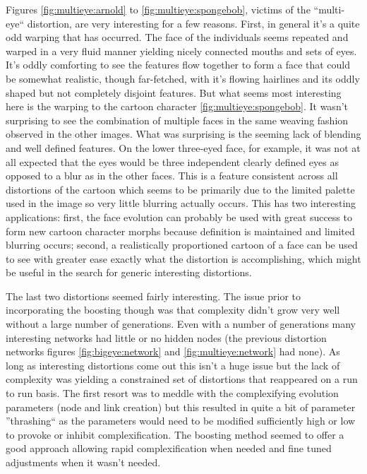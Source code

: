 Figures \ref{fig:multieye:arnold} to \ref{fig:multieye:spongebob}, victims of the ``multi-eye`` distortion, are very interesting for a few reasons. First, in general it's a quite odd warping that has occurred. The face of the individuals seems repeated and warped in a very fluid manner yielding nicely connected mouths and sets of eyes. It's oddly comforting to see the features flow together to form a face that could be somewhat realistic, though far-fetched, with it's flowing hairlines and its oddly shaped but not completely disjoint features. But what seems most interesting here is the warping to the cartoon character \ref{fig:multieye:spongebob}. It wasn't surprising to see the combination of multiple faces in the same weaving fashion observed in the other images. What was surprising is the seeming lack of blending and well defined features. On the lower three-eyed face, for example, it was not at all expected that the eyes would be three independent clearly defined eyes as opposed to a blur as in the other faces. This is a feature consistent across all distortions of the cartoon which seems to be primarily due to the limited palette used in the image so very little blurring actually occurs. This has two interesting applications: first, the face evolution can probably be used with great success to form new cartoon character morphs because definition is maintained and limited blurring occurs; second, a realistically proportioned cartoon of a face can be used to see with greater ease exactly what the distortion is accomplishing, which might be useful in the search for generic interesting distortions.

The last two distortions seemed fairly interesting. The issue prior to incorporating the boosting though was that complexity didn't grow very well without a large number of generations. Even with a number of generations many interesting networks had little or no hidden nodes (the previous distortion networks figures \ref{fig:bigeye:network} and \ref{fig:multieye:network} had none). As long as interesting distortions come out this isn't a huge issue but the lack of complexity was yielding a constrained set of distortions that reappeared on a run to run basis. The first resort was to meddle with the complexifying evolution parameters (node and link creation) but this resulted in quite a bit of parameter ''thrashing`` as the parameters would need to be modified sufficiently high or low to provoke or inhibit complexification. The boosting method seemed to offer a good approach allowing rapid complexification when needed and fine tuned adjustments when it wasn't needed.

